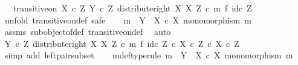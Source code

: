 \begin{isabellebody}
\ \ \ {\isachardoublequoteopen}transitive{\isacharunderscore}{\kern0pt}on\ {\isacharparenleft}{\kern0pt}X\ {\isasymtimes}\isactrlsub c\ Z{\isacharparenright}{\kern0pt}\ {\isacharparenleft}{\kern0pt}Y\ {\isasymtimes}\isactrlsub c\ Z{\isacharcomma}{\kern0pt}\ distribute{\isacharunderscore}{\kern0pt}right\ X\ X\ Z\ {\isasymcirc}\isactrlsub c\ {\isacharparenleft}{\kern0pt}m\ {\isasymtimes}\isactrlsub f\ id\isactrlsub c\ Z{\isacharparenright}{\kern0pt}{\isacharparenright}{\kern0pt}{\isachardoublequoteclose}\isanewline
%
\isadelimproof
%
\endisadelimproof
%
\isatagproof
{}\isamarkupfalse%
\ {\isacharparenleft}{\kern0pt}unfold\ transitive{\isacharunderscore}{\kern0pt}on{\isacharunderscore}{\kern0pt}def{\isacharcomma}{\kern0pt}\ safe{\isacharparenright}{\kern0pt}\isanewline
\ \ \isamarkupfalse%
\ {\isachardoublequoteopen}m\ {\isacharcolon}{\kern0pt}\ Y\ {\isasymrightarrow}\ X\ {\isasymtimes}\isactrlsub c\ X{\isachardoublequoteclose}\ {\isachardoublequoteopen}monomorphism\ m{\isachardoublequoteclose}\isanewline
\ \ \ \ \isamarkupfalse%
\ assms\ subobject{\isacharunderscore}{\kern0pt}of{\isacharunderscore}{\kern0pt}def{}\ transitive{\isacharunderscore}{\kern0pt}on{\isacharunderscore}{\kern0pt}def\ \isamarkupfalse%
\ auto\isanewline
\ \ \isamarkupfalse%
\ \isamarkupfalse%
\ {\isachardoublequoteopen}{\isacharparenleft}{\kern0pt}Y\ {\isasymtimes}\isactrlsub c\ Z{\isacharcomma}{\kern0pt}\ distribute{\isacharunderscore}{\kern0pt}right\ X\ X\ Z\ {\isasymcirc}\isactrlsub c\ m\ {\isasymtimes}\isactrlsub f\ id\isactrlsub c\ Z{\isacharparenright}{\kern0pt}\ {\isasymsubseteq}\isactrlsub c\ {\isacharparenleft}{\kern0pt}X\ {\isasymtimes}\isactrlsub c\ Z{\isacharparenright}{\kern0pt}\ {\isasymtimes}\isactrlsub c\ X\ {\isasymtimes}\isactrlsub c\ Z{\isachardoublequoteclose}\isanewline
\ \ \ \ \isamarkupfalse%
\ {\isacharparenleft}{\kern0pt}simp\ add{\isacharcolon}{\kern0pt}\ left{\isacharunderscore}{\kern0pt}pair{\isacharunderscore}{\kern0pt}subset{\isacharparenright}{\kern0pt}\isanewline
{}\isamarkupfalse%
\isanewline
\ \ \isamarkupfalse%
\ m{\isacharunderscore}{\kern0pt}def{\isacharbrackleft}{\kern0pt}type{\isacharunderscore}{\kern0pt}rule{\isacharbrackright}{\kern0pt}{\isacharcolon}{\kern0pt}\ {\isachardoublequoteopen}m\ {\isacharcolon}{\kern0pt}\ Y\ {\isasymrightarrow}\ X\ {\isasymtimes}\isactrlsub c\ X{\isachardoublequoteclose}\ {\isachardoublequoteopen}monomorphism\ m{\isachardoublequoteclose}\isanewline

\end{isabellebody}
